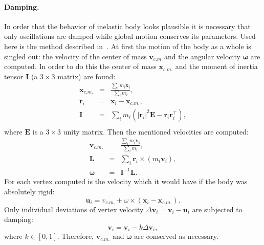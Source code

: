 \documentclass[a4paper, 12pt, titlepage]{extarticle}
\newcommand{\vect}[1]{\mathbf{#1}} %
\newcommand{\matx}[1]{\mathbf{#1}} %
\newcommand{\transposed}{\top} %
\begin{document}
        \paragraph{Damping.}
        In order that the behavior of inelastic body looks plausible it is necessary that only
        oscillations are damped while global motion conserves its parameters. Used here is the
        method described in~\cite[sec.~3.5]{mueller-position-dynamics}. At first the motion of the
        body as a whole is singled out: the velocity of the center of mass $\vect{v}_{c.m}$ and the
        angular velocity $\vect{\omega}$ are computed. In order to do this the center of mass
        $\vect{x}_{c.m.}$ and the moment of inertia tensor $\matx I$ (a $3 \times 3$ matrix) are found:
        \begin{eqnarray*}
          \vect{x}_{c.m.} & = & \frac{\sum_i m_i \vect{x_i}}{\sum_i m_i},\\
          \vect{r}_i      & = & \vect{x}_i - \vect{x}_{c.m.},\\
          \matx{I}        & = & \sum_i m_i ( |\vect{r}_i|^2 \matx E - \vect{r}_i \vect{r}_i^\transposed),\\
        \end{eqnarray*}
        where $\matx E$ is a $3 \times 3$ unity matrix. Then the mentioned velocities are computed:
        \begin{eqnarray*}
          \vect{v}_{c.m.} & = & \frac{\sum_i m_i \vect{v_i}}{\sum_i m_i},\\
          \vect{L}        & = & \sum_i \vect{r}_i \times (m_i \vect{v}_i),\\
          \vect{\omega}   & = & \matx{I}^{-1} \vect{L}.
        \end{eqnarray*}
        For each vertex computed is the velocity which it would have if the body was absolutely rigid:
        \begin{equation}\label{eq:rigid_velocity}
          \vect{u}_i = v_{c.m.} + \omega \times (\vect{x}_i - \vect{x}_{c.m.}).
        \end{equation}
        Only individual deviations of vertex velocity $\Delta \vect{v}_i = \vect{v}_i - \vect{u}_i$
        are subjected to damping:
        \begin{equation}\label{eq:damping}
          \vect{v}_i = \vect{v}_i - k \Delta \vect{v}_i,
        \end{equation}
        where $k \in [0, 1]$. Therefore, $\vect{v}_{c.m.}$ and $\vect{\omega}$ are conserved as necessary.
\end{document}
